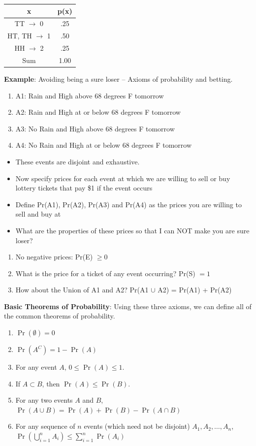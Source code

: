 \documentclass[11pt]{article}
\newcommand{\bi}{\begin{itemize}}
\newcommand{\ei}{\end{itemize}}
\newcommand{\be}{\begin{enumerate}}
\newcommand{\ee}{\end{enumerate}}
\begin{document}
\begin{center}
\begin{tabular}{c | c}
\hline
x & p(x) \\
\hline
{TT} $\rightarrow$ 0 & .25 \\
{HT, TH} $\rightarrow$ 1 & .50 \\
{HH} $\rightarrow$ 2 & .25\\
\hline
Sum & 1.00 \\
\hline
\end{tabular}
\end{center}

\item {\bf Example}: Avoiding being a sure loser -- Axioms of probability and betting.
\be
\item A1: Rain and High above 68 degrees F tomorrow
\item A2: Rain and High at or below 68 degrees F tomorrow
\item A3: No Rain and High above 68 degrees F tomorrow
\item A4: No Rain and High at or below 68 degrees F tomorrow
\ee
\bi
\item These events are disjoint and exhaustive. 
\item Now specify prices for each event at which we are willing to sell or buy lottery tickets that pay \$1 if the event occurs
\item Define Pr(A1), Pr(A2), Pr(A3) and Pr(A4) as the prices you are willing to sell and buy at
\item What are the properties of these prices so that I can NOT make you are sure loser?
\ei
\be
\item No negative prices: Pr(E) $\geq 0$
\item What is the price for a ticket of any event occurring? Pr(S) $=1$
\item How about the Union of A1 and A2? Pr(A1 $\cup$ A2) = Pr(A1) + Pr(A2)
\ee

\item {\bf Basic Theorems of Probability}: Using these three axioms,
  we can define all of the common theorems of probability.  \be
  \item $\Pr(\emptyset)=0$
  \item $\Pr({A}^C)=1-\Pr(A)$
  \item For any event $A$, $0\le \Pr(A) \le 1$.
  \item If $A\subset B$, then $\Pr(A)\le \Pr(B)$.
  \item For any two events $A$ and $B$, $\Pr(A\cup
B)=\Pr(A)+\Pr(B)-\Pr(A\cap B)$
  \item For any sequence of $n$ events (which need not be disjoint)
$A_1,A_2,\ldots,A_n$,\\
$\Pr\left( \bigcup\limits_{i=1}^n
A_i\right) \leq \sum\limits_{i=1}^n \Pr(A_i)$
  \ee
\end{document}

